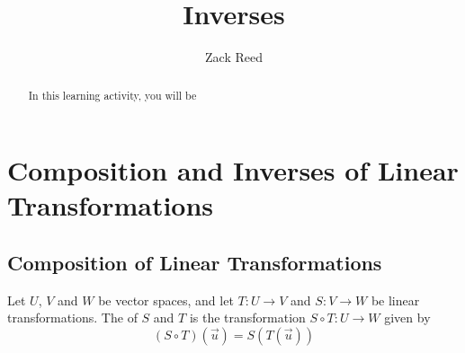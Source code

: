 \documentclass{ximera}
\author{Zack Reed}
\title{Inverses}
\begin{document}
\begin{abstract}

    In this learning activity, you will be 
\end{abstract}
\maketitle
 
\section*{Composition and Inverses of Linear Transformations}
 
\subsection*{Composition of Linear Transformations}
\begin{definition}\label{def:compoflintrans} Let $U$, $V$ and $W$ be vector spaces, and let $T:U\rightarrow V$ and $S:V\rightarrow W$ be linear transformations.  The  of $S$ and $T$ is the transformation $S\circ T:U\rightarrow W$ given by
$$(S\circ T)(\vec{u})=S(T(\vec{u}))$$
\end{definition}
 
\end{document}
